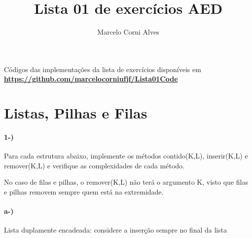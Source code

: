 \documentclass[portuguese,12pt,a4paper]{article}
\title{Lista 01 de exercícios AED}
\author{Marcelo Corni Alves}
\begin{document}
	\maketitle

\begin{center}
	Códigos das implementações da lista de exercícios disponíveis em
	 \textbf{\url{https://github.com/marcelocorniufjf/Lista01Code}}
\end{center}


\section*{Listas, Pilhas e Filas}

\paragraph{1-)}
Para cada estrutura abaixo, implemente os métodos contido(K,L), inserir(K,L) e remover(K,L) e verifique as complexidades de cada método.

No caso de filas e pilhas, o remover(K,L) não terá o argumento K, visto que filas e pilhas removem sempre quem está na extremidade.

\paragraph{a-)}
Lista duplamente encadeada: considere a inserção sempre no final da lista
\end{document}
